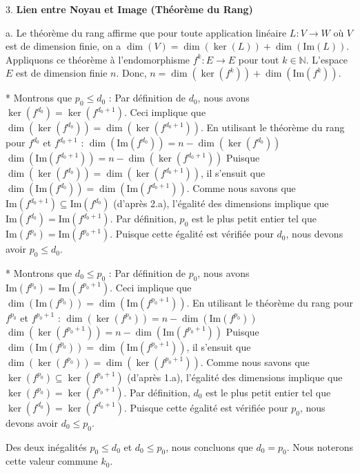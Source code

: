 \documentclass{report}
\begin{document}
3.  \textbf{Lien entre Noyau et Image (Théorème du Rang)}

    a.  Le théorème du rang affirme que pour toute application linéaire $L: V \to W$ où $V$ est de dimension finie, on a $\dim(V) = \dim(\ker(L)) + \dim(\text{Im}(L))$.
        Appliquons ce théorème à l'endomorphisme $f^k: E \to E$ pour tout $k \in \mathbb{N}$. L'espace $E$ est de dimension finie $n$.
        Donc, $n = \dim(\ker(f^k)) + \dim(\text{Im}(f^k))$.

        *   Montrons que $p_0 \le d_0$ :
            Par définition de $d_0$, nous avons $\ker(f^{d_0}) = \ker(f^{d_0+1})$.
            Ceci implique que $\dim(\ker(f^{d_0})) = \dim(\ker(f^{d_0+1}))$.
            En utilisant le théorème du rang pour $f^{d_0}$ et $f^{d_0+1}$ :
            $\dim(\text{Im}(f^{d_0})) = n - \dim(\ker(f^{d_0}))$
            $\dim(\text{Im}(f^{d_0+1})) = n - \dim(\ker(f^{d_0+1}))$
            Puisque $\dim(\ker(f^{d_0})) = \dim(\ker(f^{d_0+1}))$, il s'ensuit que $\dim(\text{Im}(f^{d_0})) = \dim(\text{Im}(f^{d_0+1}))$.
            Comme nous savons que $\text{Im}(f^{d_0+1}) \subseteq \text{Im}(f^{d_0})$ (d'après 2.a), l'égalité des dimensions implique que $\text{Im}(f^{d_0}) = \text{Im}(f^{d_0+1})$.
            Par définition, $p_0$ est le plus petit entier tel que $\text{Im}(f^{p_0}) = \text{Im}(f^{p_0+1})$. Puisque cette égalité est vérifiée pour $d_0$, nous devons avoir $p_0 \le d_0$.

        *   Montrons que $d_0 \le p_0$ :
            Par définition de $p_0$, nous avons $\text{Im}(f^{p_0}) = \text{Im}(f^{p_0+1})$.
            Ceci implique que $\dim(\text{Im}(f^{p_0})) = \dim(\text{Im}(f^{p_0+1}))$.
            En utilisant le théorème du rang pour $f^{p_0}$ et $f^{p_0+1}$ :
            $\dim(\ker(f^{p_0})) = n - \dim(\text{Im}(f^{p_0}))$
            $\dim(\ker(f^{p_0+1})) = n - \dim(\text{Im}(f^{p_0+1}))$
            Puisque $\dim(\text{Im}(f^{p_0})) = \dim(\text{Im}(f^{p_0+1}))$, il s'ensuit que $\dim(\ker(f^{p_0})) = \dim(\ker(f^{p_0+1}))$.
            Comme nous savons que $\ker(f^{p_0}) \subseteq \ker(f^{p_0+1})$ (d'après 1.a), l'égalité des dimensions implique que $\ker(f^{p_0}) = \ker(f^{p_0+1})$.
            Par définition, $d_0$ est le plus petit entier tel que $\ker(f^{d_0}) = \ker(f^{d_0+1})$. Puisque cette égalité est vérifiée pour $p_0$, nous devons avoir $d_0 \le p_0$.

        Des deux inégalités $p_0 \le d_0$ et $d_0 \le p_0$, nous concluons que $d_0 = p_0$. Nous noterons cette valeur commune $k_0$.
\end{document}
